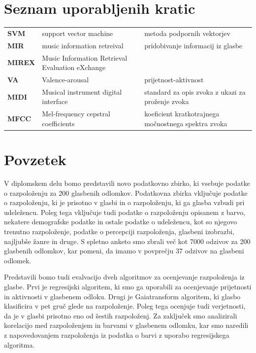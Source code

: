 \documentclass[a4paper, 12pt]{book}
\newcommand{\clearemptydoublepage}{\newpage{\pagestyle{empty}\cleardoublepage}}
\begin{document}
{\chapter*{Seznam uporabljenih kratic}

\begin{tabular}{p{2cm}|p{5.6cm}|p{5.6cm}}
  
  {\bf SVM} & support vector machine & metoda podpornih vektorjev \\
  {\bf MIR} & music information retreival & pridobivanje informacij iz glasbe \\
  {\bf MIREX} & Music Information Retrieval Evaluation eXchange &  \\
  {\bf VA} & Valence-arousal & prijetnost-aktivnost \\
  {\bf MIDI} & Musical instrument digital interface & standard za opis zvoka z ukazi za proženje zvoka \\
  {\bf MFCC} & Mel-frequency cepstral coefficients & koeficient kratkotrajnega močnostnega spektra zvoka \\
  
  
  

\end{tabular}



\clearemptydoublepage

\chapter*{Povzetek}

V diplomskem delu bomo predstavili novo podatkovno zbirko, ki vsebuje podatke o razpoloženju za 200 glasbenih odlomkov. Podatkovna zbirka vključuje podatke o razpoloženju, ki je prisotno v glasbi in o razpoloženju, ki ga glasba vzbudi pri udeležencu. Poleg tega vključuje tudi podatke o razpoloženju opisanem z barvo, nekatere demografske podatke in ostale podatke o udeležencu, kot so njegovo trenutno razpoloženje, podatke o percepciji razpoloženja, glasbeni izobrazbi, najljubše žanre in druge. S spletno anketo smo zbrali več kot 7000 odzivov za 200 glasbenih odlomkov, kar pomeni, da imamo v povprečju 37 odzivov na glasbeni odlomek. 

Predstavili bomo tudi evalvacijo dveh algoritmov za ocenjevanje razpoloženja iz glasbe. Prvi je regresijski algoritem, ki smo ga uporabili za ocenjevanje prijetnosti in aktivnosti v glasbenem odloku. Drugi je Gaiatransform algoritem, ki glasbo klasificira v pet gruč glede na razpoloženje. Poleg tega ocenjuje tudi verjetnosti, da je v glasbi prisotno eno od šestih razpoloženj. Za zaključek smo analizirali korelacijo med razpoloženjem in barvami v glasbenem odlomku, kar smo naredili z napovedovanjem razpoloženja iz podatka o barvi z uporabo regresijskega algoritma.  


}
\end{document}
